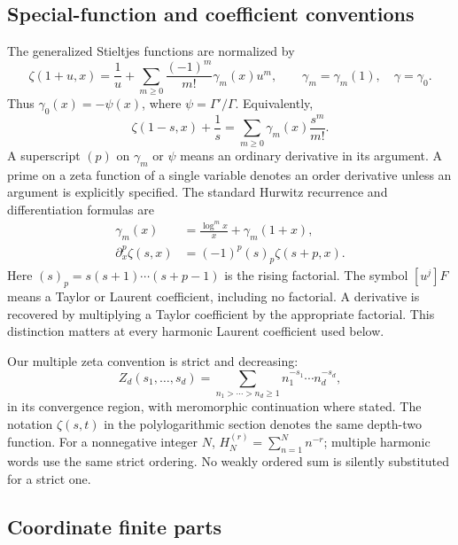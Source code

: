 \subsection{Special-function and coefficient conventions}

The generalized Stieltjes functions are normalized by
\begin{equation}\label{scope:stieltjes}
 \zeta(1+u,x)=\frac1u+
       \sum_{m\ge0}\frac{(-1)^m}{m!}\gamma_m(x)u^m,
 \qquad \gamma_m=\gamma_m(1),\quad \gamma=\gamma_0.
\end{equation}
Thus $\gamma_0(x)=-\psi(x)$, where $\psi=\Gamma'/\Gamma$.
Equivalently,
\[
 \zeta(1-s,x)+\frac1s=\sum_{m\ge0}\gamma_m(x)\frac{s^m}{m!}.
\]
A superscript $(p)$ on $\gamma_m$ or $\psi$ means an ordinary derivative
in its argument. A prime on a zeta function of a single variable denotes
an order derivative unless an argument is explicitly specified.
The standard Hurwitz recurrence and differentiation formulas are
\cite{dlmf:hurwitz,dlmf:polygamma}
\begin{align}
 \gamma_m(x)&=\frac{\log^m x}{x}+\gamma_m(1+x),
       \label{scope:recurrence}\\
 \partial_x^p\zeta(s,x)&=(-1)^p(s)_p\zeta(s+p,x).
       \label{scope:hurwitzderivative}
\end{align}
Here $(s)_p=s(s+1)\cdots(s+p-1)$ is the rising factorial.
The symbol $[u^j]F$ means a Taylor or Laurent coefficient, including
no factorial. A derivative is recovered by multiplying a Taylor
coefficient by the appropriate factorial. This distinction matters at
every harmonic Laurent coefficient used below.

Our multiple zeta convention is strict and decreasing:
\[
 Z_d(s_1,\ldots,s_d)
   =\sum_{n_1>\cdots>n_d\ge1}
       n_1^{-s_1}\cdots n_d^{-s_d},
\]
in its convergence region, with meromorphic continuation where stated.
The notation $\zeta(s,t)$ in the polylogarithmic section denotes the
same depth-two function. For a nonnegative integer $N$,
$H_N^{(r)}=\sum_{n=1}^N n^{-r}$; multiple harmonic words use the same
strict ordering. No weakly ordered sum is silently substituted for a
strict one.

\subsection{Coordinate finite parts}

